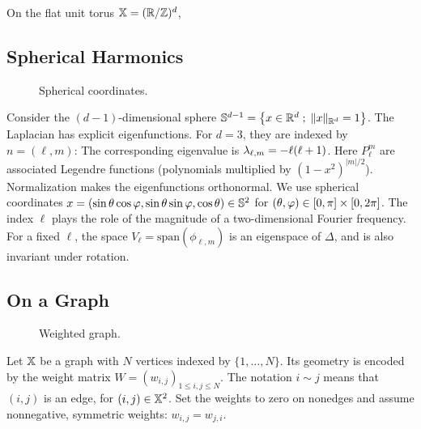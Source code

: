 On the flat unit torus $\mathbb{X}=(\mathbb{R}/\mathbb{Z})^d$,

\subsection{Spherical Harmonics}
\label{sec-spherical-harm}

\begin{figure}[tbp]
\centering
{}
\caption{Spherical coordinates.}
\label{fig-review-fourier-spherical-coordinates}
\end{figure}
Consider the $(d-1)$-dimensional sphere $\mathbb{S}^{d-1} = \left\{ x \in \mathbb{R}^d \;;\; \lVert x\rVert_{\mathbb{R}^d}=1 \right\}$.
% 
The Laplacian has explicit eigenfunctions. For $d=3$, they are indexed by $n=(\ell,m)$:
The corresponding eigenvalue is $\lambda_{\ell,m} = -\ell(\ell+1)$. Here $P_{\ell}^m$ are associated Legendre functions (polynomials multiplied by $(1-x^2)^{|m|/2}$). Normalization makes the eigenfunctions orthonormal. We use spherical coordinates $x=(\sin\theta\cos\varphi,\sin\theta\sin\varphi,\cos\theta)\in\mathbb S^2$ for $(\theta,\varphi) \in [0,\pi] \times [0,2\pi]$.
%
The index $\ell$ plays the role of the magnitude of a two-dimensional Fourier frequency.
%
For a fixed $\ell$, the space $V_\ell = \text{span}( \phi_{\ell,m} )$ is an eigenspace of $\Delta$, and is also invariant under rotation. 
	

\subsection{On a Graph}

\begin{figure}[tbp]
\centering
{}
\caption{Weighted graph.}
\label{fig-review-fourier-weighted-graph}
\end{figure}
Let $\mathbb{X}$ be a graph with $N$ vertices indexed by $\{1,\ldots,N\}$. Its geometry is encoded by the weight matrix $W=(w_{i,j})_{1\leq i,j\leq N}$. The notation $i \sim j$ means that $(i,j)$ is an edge, for $(i,j) \in \mathbb{X}^2$. Set the weights to zero on nonedges and assume nonnegative, symmetric weights: $w_{i,j}=w_{j,i}$.

